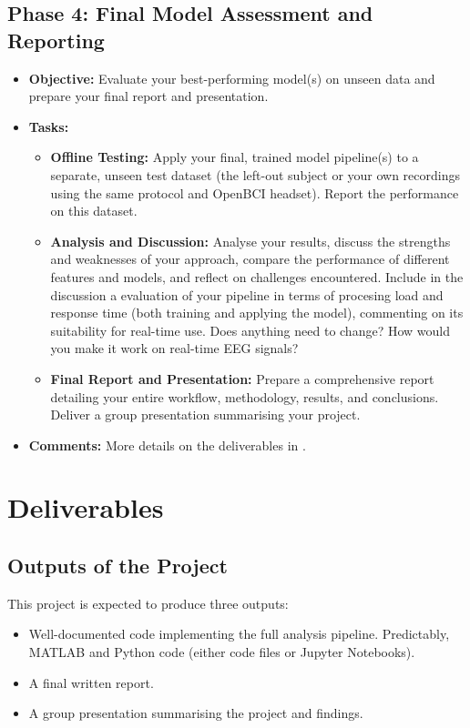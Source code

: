 \documentclass[11pt]{exam}
\begin{document}
    \subsection{Phase 4: Final Model Assessment and Reporting}
    \begin{itemize}
        \item \textbf{Objective:} Evaluate your best-performing model(s) on unseen data and prepare your final report and presentation.
        \item \textbf{Tasks:}
        \begin{itemize}
            \item \textbf{Offline Testing:} Apply your final, trained model pipeline(s) to a separate, unseen test dataset (the left-out subject or your own recordings using the same protocol and OpenBCI headset). Report the performance on this dataset.
            \item \textbf{Analysis and Discussion:} Analyse your results, discuss the strengths and weaknesses of your approach, compare the performance of different features and models, and reflect on challenges encountered. Include in the discussion a evaluation of your pipeline in terms of procesing load and response time (both training and applying the model), commenting on its suitability for real-time use. Does anything need to change? How would you make it work on real-time EEG signals?
            \item \textbf{Final Report and Presentation:} Prepare a comprehensive report detailing your entire workflow, methodology, results, and conclusions. Deliver a group presentation summarising your project.
        \end{itemize}
        \item \textbf{Comments:} More details on the deliverables in .
    \end{itemize}

    \newpage
    \section{Deliverables}
    \label{sec:deliverables}

    \subsection{Outputs of the Project}
    This project is expected to produce three outputs:
    \begin{itemize}
        \item Well-documented code implementing the full analysis pipeline. Predictably, MATLAB and Python code (either code files or Jupyter Notebooks).
        \item A final written report.
        \item A group presentation summarising the project and findings.
    \end{itemize}
\end{document}
